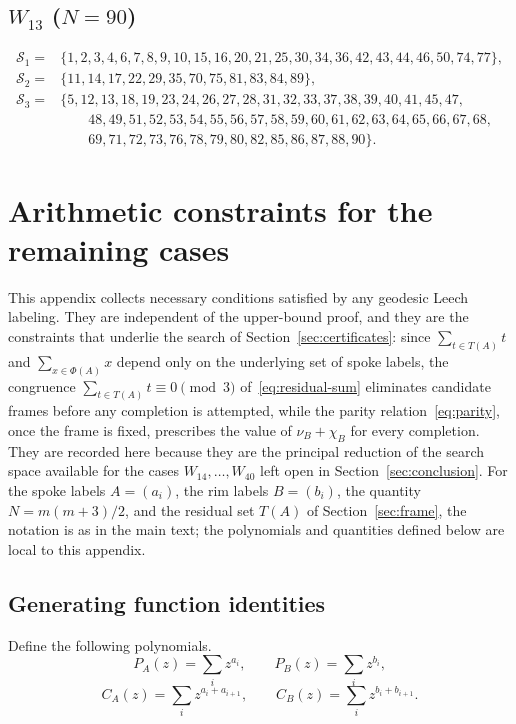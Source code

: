 \documentclass[11pt]{article}
\theoremstyle{definition}
\theoremstyle{remark}
\numberwithin{equation}{section}
\begin{document}
\subsection*{$W_{13}$ ($N=90$)}
\begin{align*}
\mathcal S_1={}&\{1,2,3,4,6,7,8,9,10,15,16,20,21,25,30,34,36,42,43,44,46,50,74,77\},\\
\mathcal S_2={}&\{11,14,17,22,29,35,70,75,81,83,84,89\},\\
\mathcal S_3={}&\{5,12,13,18,19,23,24,26,27,28,31,32,33,37,38,39,40,41,45,47,\\
&\qquad48,49,51,52,53,54,55,56,57,58,59,60,61,62,63,64,65,66,67,68,\\
&\qquad69,71,72,73,76,78,79,80,82,85,86,87,88,90\}.
\end{align*}

\section{Arithmetic constraints for the remaining cases}\label{app:identities}

This appendix collects necessary conditions satisfied by any geodesic Leech labeling. They are independent of the upper-bound proof, and they are the constraints that underlie the search of Section~\ref{sec:certificates}: since $\sum_{t\in T(A)}t$ and $\sum_{x\in\Phi(A)}x$ depend only on the underlying set of spoke labels, the congruence $\sum_{t\in T(A)}t\equiv0\pmod3$ of~\eqref{eq:residual-sum} eliminates candidate frames before any completion is attempted, while the parity relation~\eqref{eq:parity}, once the frame is fixed, prescribes the value of $\nu_B+\chi_B$ for every completion. They are recorded here because they are the principal reduction of the search space available for the cases $W_{14},\ldots,W_{40}$ left open in Section~\ref{sec:conclusion}. For the spoke labels $A=(a_i)$, the rim labels $B=(b_i)$, the quantity $N=m(m+3)/2$, and the residual set $T(A)$ of Section~\ref{sec:frame}, the notation is as in the main text; the polynomials and quantities defined below are local to this appendix.

\subsection{Generating function identities}

Define the following polynomials.
\[
  P_A(z)=\sum_i z^{a_i},\qquad P_B(z)=\sum_i z^{b_i},
\]
\[
  C_A(z)=\sum_i z^{a_i+a_{i+1}},\qquad
  C_B(z)=\sum_i z^{b_i+b_{i+1}}.
\]
\end{document}
